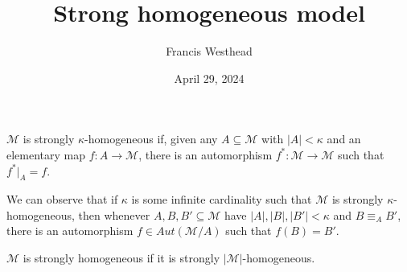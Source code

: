 \documentclass[a4paper]{article}
\title{Strong homogeneous model}
\date{April 29, 2024}
\author{Francis Westhead}
\begin{document}
\maketitle
\par{\(\mathcal {M}\) is strongly \(\kappa\)-homogeneous if, 
given any \(A  \subseteq   \mathcal {M}\) with \(|A| <  \kappa\) and an elementary map 
\(f:A  \rightarrow   \mathcal {M}\), there is an automorphism 
\(f^*:  \mathcal {M}  \rightarrow   \mathcal {M}\) such that \(f^*|_A = f\).}\par{We can observe that if \(\kappa\) is some infinite cardinality such that \(\mathcal {M}\) is strongly \(\kappa\)-homogeneous,
then whenever \(A,B,B' \subseteq   \mathcal {M}\) have \(|A|,|B|,|B'|< \kappa\) and \(B  \equiv _A B'\), 
there is an automorphism \(f  \in  Aut( \mathcal {M}/A)\) such that \(f(B)=B'\).}\par{\(\mathcal {M}\) is strongly homogeneous if it is strongly \(| \mathcal {M}|\)-homogeneous.}
\printbibliography
\end{document}
